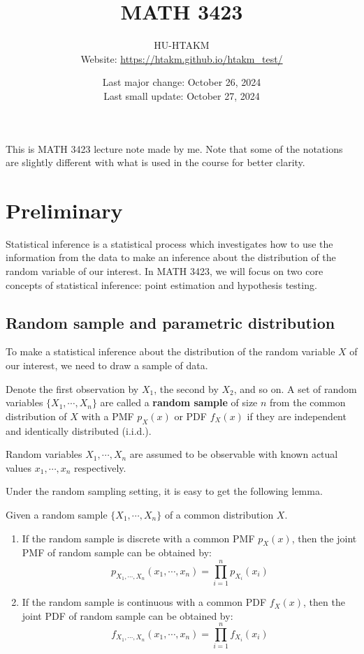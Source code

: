 \documentclass{huhtakm-template-book-v2}
\title{
	\Huge MATH 3423
}
\author{
	HU-HTAKM\\
	\small Website: \url{https://htakm.github.io/htakm_test/}
}
\date{
	Last major change: October 26, 2024\\
	Last small update: October 27, 2024
}
\begin{document}
\maketitle
This is MATH 3423 lecture note made by me. Note that some of the notations are slightly different with what is used in the course for better clarity.
\tableofcontents
\chapter{Preliminary}
Statistical inference is a statistical process which investigates how to use the information from the data to make an inference about the distribution of the random variable of our interest. In MATH 3423, we will focus on two core concepts of statistical inference: point estimation and hypothesis testing.
\section{Random sample and parametric distribution}
To make a statistical inference about the distribution of the random variable $X$ of our interest, we need to draw a sample of data.
\begin{defn}
	Denote the first observation by $X_{1}$, the second by $X_{2}$, and so on. A set of random variables $\{X_{1},\cdots,X_{n}\}$ are called a \textbf{random sample} of size $n$ from the common distribution of $X$ with a PMF $p_{X}(x)$ or PDF $f_{X}(x)$ if they are independent and identically distributed (i.i.d.).
\end{defn}
\begin{rem}
	Random variables $X_{1},\cdots,X_{n}$ are assumed to be observable with known actual values $x_{1},\cdots,x_{n}$ respectively.
\end{rem}
Under the random sampling setting, it is easy to get the following lemma.
\begin{lem}
	Given a random sample $\{X_{1},\cdots,X_{n}\}$ of a common distribution $X$.
	\begin{enumerate}
		\item If the random sample is discrete with a common PMF $p_{X}(x)$, then the joint PMF of random sample can be obtained by:
		\begin{equation*}
			p_{X_{1},\cdots,X_{n}}(x_{1},\cdots,x_{n})=\prod_{i=1}^{n}p_{X_{i}}(x_{i})
		\end{equation*}
		\item If the random sample is continuous with a common PDF $f_{X}(x)$, then the joint PDF of random sample can be obtained by:
		\begin{equation*}
			f_{X_{1},\cdots,X_{n}}(x_{1},\cdots,x_{n})=\prod_{i=1}^{n}f_{X_{i}}(x_{i})
		\end{equation*}
	\end{enumerate}
\end{lem}
\end{document}
